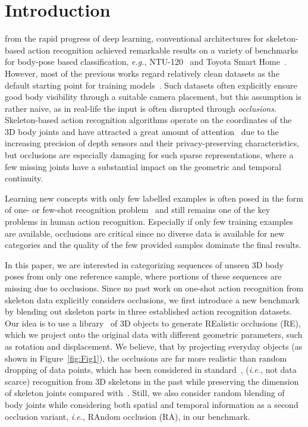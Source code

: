 \documentclass[lettersize,journal]{IEEEtran}
\begin{document}
\section{Introduction}

 from the rapid progress of deep learning, conventional architectures for skeleton-based action recognition achieved remarkable results on a variety of benchmarks for body-pose based classification, \textit{e.g.}, NTU-120~\cite{liu2019ntu} and Toyota Smart Home~\cite{Das_2019_ICCV}.
However, most of the previous works regard relatively clean datasets as the default starting point for training models~\cite{liu2019ntu,zhang2021stst,chen2021channel,yan2018spatial}.
Such datasets often explicitly ensure good body visibility through a suitable camera placement, but this assumption is rather naive, as in real-life the input is often disrupted through \textit{occlusions}.
Skeleton-based action recognition algorithms operate on the coordinates of the 3D body joints and have attracted a great amount of attention~\cite{zhang2021stst,chen2021channel,yan2018spatial,bai2021gcst,cheng2021motion,mazzia2021action,plizzari2021skeleton,plizzari2021spatial,song2022constructing} due to the increasing precision of depth sensors and their privacy-preserving characteristics, but occlusions are especially damaging for such sparse representations, where a few missing joints have a substantial impact on the geometric and temporal continuity.

Learning new concepts with only few labelled examples is often posed in the form of one- or few-shot recognition problem~\cite{cao2021fewshot,gao2020pairwise,hong2021video_pose_distillation,patravali2021metauvfs,perrett2021temporal} and still remains one of the key problems in human action recognition.
Especially if only few training examples are available, occlusions are critical since no diverse data is available for new categories and the quality of the few provided samples dominate the final results.

In this paper, we are interested in categorizing sequences of unseen 3D body poses from only one reference sample, where portions of these sequences are missing due to occlusions. 
Since no past work on one-shot action recognition from skeleton data explicitly considers occlusions, we first introduce a new benchmark by blending out skeleton parts in three established action recognition datasets.  
Our idea is to use a library~\cite{sun2018pix3d} of 3D objects to generate REalistic occlusions (RE), which we project onto the original data with different geometric parameters, such as rotation and displacement.
We believe, that by projecting everyday objects (as shown in Figure~\ref{fig:Fig1}), the occlusions are far more realistic than random dropping of data points, which has been considered in standard~\cite{song2019richly,song2020richly}, (\textit{i.e.}, not data scarce)  recognition from 3D skeletons in the past while preserving the dimension of skeleton joints compared with~\cite{wu2020osd}.
Still, we also consider random blending of body joints while considering both spatial and temporal information as a second occlusion variant, \textit{i.e.}, RAndom occlusion (RA), in our benchmark. 
\end{document}
